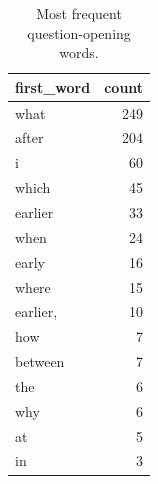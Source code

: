\begin{table}[t]
\centering
\small
\caption{Most frequent question-opening words.}
\label{tab:firstwords}
\begin{tabular}{lr}
\toprule
first\_word & count \\
\midrule
what & 249 \\
after & 204 \\
i & 60 \\
which & 45 \\
earlier & 33 \\
when & 24 \\
early & 16 \\
where & 15 \\
earlier, & 10 \\
how & 7 \\
between & 7 \\
the & 6 \\
why & 6 \\
at & 5 \\
in & 3 \\
\bottomrule
\end{tabular}
\end{table}
